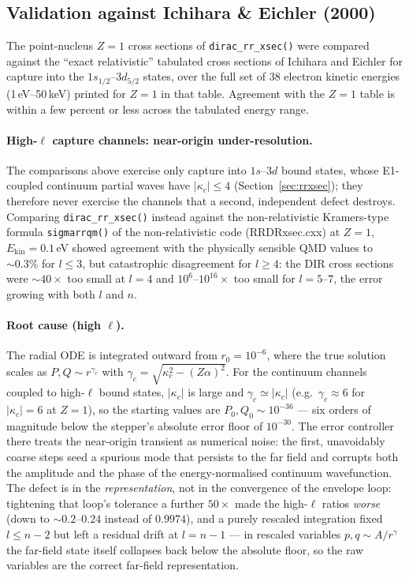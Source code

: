 \documentclass[11pt,a4paper]{article}
\begin{document}
\subsection{Validation against Ichihara \& Eichler (2000)}
\label{sec:ichiharavalidation}

The point-nucleus $Z=1$ cross sections of {\tt dirac\_rr\_xsec()} were
compared against the ``exact relativistic'' tabulated cross sections of
Ichihara and Eichler \cite{Ichihara2000} for capture into the
$1s_{1/2}$--$3d_{5/2}$ states, over the full set of 38 electron kinetic
energies (1\,eV--50\,keV) printed for $Z=1$ in that table. Agreement 
with the $Z=1$ table is within a few percent or less across the tabulated 
energy range.

\paragraph{High-$\ell$ capture channels: near-origin under-resolution.}
The comparisons above exercise only capture into $1s$--$3d$ bound
states, whose E1-coupled continuum partial waves have
$|\kappa_{c}|\le4$ (Section~\ref{sec:rrxsec}); they therefore never
exercise the channels that a second, independent defect destroys.
Comparing {\tt dirac\_rr\_xsec()} instead against the non-relativistic
Kramers-type formula {\tt sigmarrqm()} of the non-relativistic code
(RRDRxsec.cxx) at $Z=1$, $E_{\mathrm{kin}}=0.1$\,eV showed agreement
with the physically sensible QMD values to $\sim0.3\%$ for $l\le3$, but
catastrophic disagreement for $l\ge4$: the DIR cross sections were
$\sim40\times$ too small at $l=4$ and $10^{6}$--$10^{16}\times$ too
small for $l=5$--$7$, the error growing with both $l$ and $n$.

\paragraph{Root cause (high $\ell$).} The radial ODE is integrated
outward from $r_{0}=10^{-6}$, where the true solution scales as
$P,Q\sim r^{\gamma_{c}}$ with
$\gamma_{c}=\sqrt{\kappa_{c}^{2}-(Z\alpha)^{2}}$.  For the continuum
channels coupled to high-$\ell$ bound states, $|\kappa_{c}|$ is large
and $\gamma_{c}\simeq|\kappa_{c}|$ (e.g.\ $\gamma_{c}\approx6$ for
$|\kappa_{c}|=6$ at $Z=1$), so the starting values are
$P_{0},Q_{0}\sim10^{-36}$ --- six orders of magnitude below the
stepper's absolute error floor of $10^{-30}$.  The error controller
there treats the near-origin transient as numerical noise: the first,
unavoidably coarse steps seed a spurious mode that persists to the far
field and corrupts both the amplitude and the phase of the
energy-normalised continuum wavefunction.  The defect is in the
\emph{representation}, not in the convergence of the envelope loop:
tightening that loop's tolerance a further $50\times$ made the
high-$\ell$ ratios \emph{worse} (down to $\sim0.2$--$0.24$ instead of
$0.9974$), and a purely rescaled integration fixed $l\le n-2$ but left
a residual drift at $l=n-1$ --- in rescaled variables $p,q\sim A/r^{\gamma}$
the far-field state itself collapses back below the absolute floor, so
the raw variables are the correct far-field representation.
\end{document}
